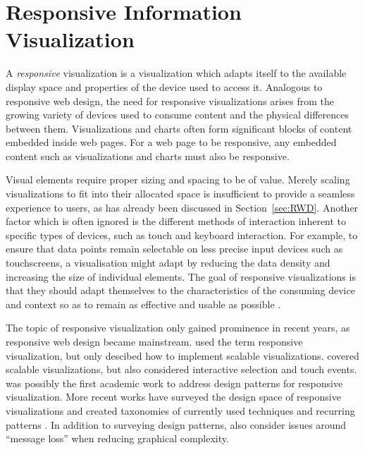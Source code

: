 
\chapter{Responsive Information Visualization}

A \emph{responsive} visualization is a visualization which adapts
itself to the available display space and properties of the device
used to access it. Analogous to responsive web design, the need for
responsive visualizations arises from the growing variety of devices
used to consume content and the physical differences between them.
Visualizations and charts often form significant blocks of content
embedded inside web pages. For a web page to be responsive, any
embedded content such as visualizations and charts must also be
responsive.

Visual elements require proper sizing and spacing to be of
value. Merely scaling visualizations to fit into their allocated space
is insufficient to provide a seamless experience to users, as has
already been discussed in Section~\ref{sec:RWD}. Another factor which
is often ignored is the different methods of interaction inherent to
specific types of devices, such as touch and keyboard interaction. For
example, to ensure that data points remain selectable on less precise
input devices such as touchscreens, a visualisation might adapt by
reducing the data density and increasing the size of individual
elements. The goal of responsive visualizations is that they should
adapt themselves to the characteristics of the consuming device and
context so as to remain as effective and usable as possible
\parencite{DesignPatternsTradeOffsRespVis}.


The topic of responsive visualization only gained prominence in recent
years, as responsive web design became mainstream.
\textcite{BuildingRespDataVisForTheWeb} used the term responsive
visualization, but only descibed how to implement scalable
visualizations. \textcite{LearningRespDataVis} covered scalable
visualizations, but also considered interactive selection and touch
events.
%
\textcite{RespVis} was possibly the first academic work to address
design patterns for responsive visualization. More recent works have
surveyed the design space of responsive visualizations and created
taxonomies of currently used techniques and recurring patterns
\parencite{TechniquesForFlexibleRespVisDesign,RespVisSurvey}.
In addition to surveying design patterns,
\textcite{DesignPatternsTradeOffsRespVis} also consider issues around
\enquote{message loss} when reducing graphical complexity.


